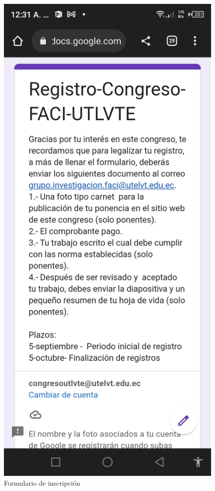 \documentclass[a4paper,14px]{article}
\begin{document}
\begin{minipage}[H]{0.45\linewidth}
  \begin{figure}[H]
    \centering
    \includegraphics[scale=0.25]{inscripcion2.jpg}
    \caption{Formulario de inscripción}
    \label{fig:arquitectura2}
  \end{figure}
\end{minipage}
\end{document}
